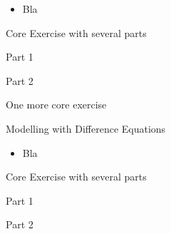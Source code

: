 \begin{lesson}

	\begin{itemize}
		\item Bla
	\end{itemize}
	

\end{lesson}


\newpage

\question
	Core Exercise with several parts
\begin{parts}
	\item Part 1
	\item Part 2
\end{parts}

\bookonlynewpage


\question
	One more core exercise














%
%



\begin{module}{Modelling with Difference Equations}
	\label{diff:model}

	
	
\end{module}



\begin{lesson}

	\begin{itemize}
		\item Bla
	\end{itemize}
	

\end{lesson}


\newpage

\question
	Core Exercise with several parts
\begin{parts}
	\item Part 1
	\item Part 2
\end{parts}


